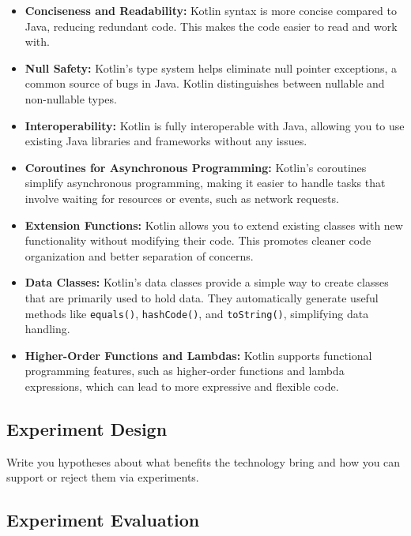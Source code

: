 \begin{itemize}
    \item \textbf{Conciseness and Readability:} Kotlin syntax is more concise compared to Java, reducing redundant code. This makes the code easier to read and work with.
    
    \item \textbf{Null Safety:} Kotlin's type system helps eliminate null pointer exceptions, a common source of bugs in Java. Kotlin distinguishes between nullable and non-nullable types.
    
    \item \textbf{Interoperability:} Kotlin is fully interoperable with Java, allowing you to use existing Java libraries and frameworks without any issues.
    
    \item \textbf{Coroutines for Asynchronous Programming:} Kotlin's coroutines simplify asynchronous programming, making it easier to handle tasks that involve waiting for resources or events, such as network requests.
    
    \item \textbf{Extension Functions:} Kotlin allows you to extend existing classes with new functionality without modifying their code. This promotes cleaner code organization and better separation of concerns.
    
    \item \textbf{Data Classes:} Kotlin's data classes provide a simple way to create classes that are primarily used to hold data. They automatically generate useful methods like \texttt{equals()}, \texttt{hashCode()}, and \texttt{toString()}, simplifying data handling.
    
    \item \textbf{Higher-Order Functions and Lambdas:} Kotlin supports functional programming features, such as higher-order functions and lambda expressions, which can lead to more expressive and flexible code.
\end{itemize}


\subsection{Experiment Design}

Write you hypotheses about what benefits the technology bring and how you can support or reject them via experiments.

\subsection{Experiment Evaluation}

